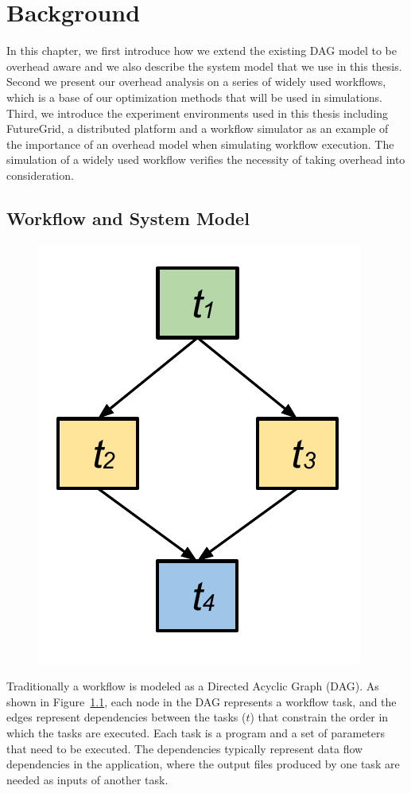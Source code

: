 \chapter{Background}
\label{chap:model}

In this chapter, we first introduce how we extend the existing DAG model to be overhead aware and we also describe the system model that we use in this thesis. Second we present our overhead analysis on a series of widely used workflows, which is a base of our optimization methods that will be used in simulations. Third, we introduce the experiment environments used in this thesis including FutureGrid, a distributed platform and a workflow simulator as an example of the importance of an overhead model when simulating workflow execution. The simulation of a widely used workflow verifies the necessity of taking overhead into consideration. 
\section{Workflow and System Model}

\begin{figure}[h!]
\includegraphics[width=0.3\linewidth]{figures/model/dag.pdf}
\centering
  \label{fig:model_dag}
\end{figure}

Traditionally a workflow is modeled as a Directed Acyclic Graph (DAG). As shown in Figure~\ref{fig:model_dag}, each node in the DAG represents a workflow task, and the edges represent dependencies between the tasks ($t$) that constrain the order in which the tasks are executed. Each task is a program and a set of parameters that need to be executed. 
 The dependencies typically represent data flow dependencies in the application, where the output files produced by one task are needed as inputs of another task. 

